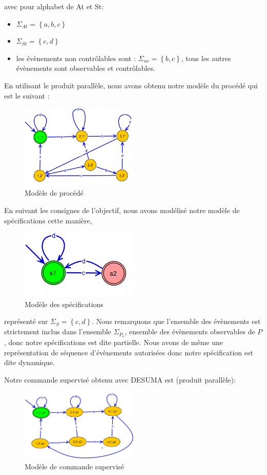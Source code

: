 avec pour alphabet de At et St:
\begin{itemize}[label = \textbullet]
\item $\Sigma_{At} = \left\lbrace a,b,c \right\rbrace $
\item $\Sigma_{St} = \left\lbrace c,d\right\rbrace$
\item les évènements non contrôlables sont : $\Sigma_{nc}=\left\lbrace b,c \right\rbrace$, tous les autres évènements sont observables et contrôlables.
\end{itemize}

En utilisant le produit parallèle, nous avons obtenu notre modèle du procédé qui est le suivant : \begin{figure}
\centering
\includegraphics[width = 0.5\textwidth]{./II/images/P.png}
\caption{Modèle de procédé}
\end{figure}

En suivant les consignes de l'objectif, nous avons modélisé notre modèle de spécifications cette manière, \begin{figure}[!ht]
\centering
\includegraphics[width = 0.5\textwidth]{./II/images/S.png}
\caption{Modèle des spécifications}
\end{figure}
représenté sur $\Sigma_S = \left\lbrace c,d\right\rbrace$. Nous remarquons que l'ensemble des évènements est strictement inclus dans l'ensemble $\Sigma_{P_o}$, ensemble des évènements observables de $P$, donc notre spécifications est dite partielle. Nous avons de même une représentation de séquence d'évènements autorisées donc notre spécification est dite dynamique.

Notre commande supervisé obtenu avec DESUMA est (produit parallèle):\begin{figure}[!ht]
\centering
\includegraphics[width = 0.5\textwidth]{./II/images/P_S.png}
\caption{Modèle de commande supervisé}
\end{figure}

